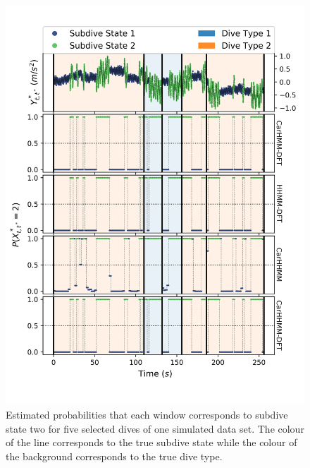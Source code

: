 \begin{figure}[ht]
    \centering
    \includegraphics[width=4.5in]{../Plots/Posterior_Fine_States.png}
    \caption{Estimated probabilities that each window corresponds to subdive state two for five selected dives of one simulated data set. The colour of the line corresponds to the true subdive state while the colour of the background corresponds to the true dive type.}
    \label{fig:acc_fine}
\end{figure}